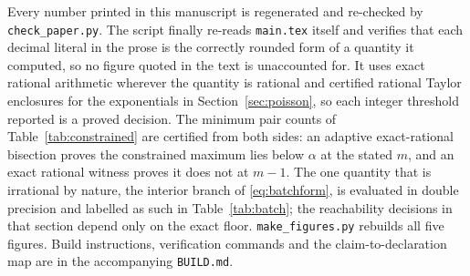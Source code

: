 \documentclass[11pt]{article}
\theoremstyle{remark}\newtheorem{remark}[theorem]{Remark}
\begin{document}
Every number printed in this manuscript is regenerated and re-checked by
\texttt{check\_paper.py}. The script finally re-reads \texttt{main.tex} itself
and verifies that each decimal literal in the prose is the correctly rounded form
of a quantity it computed, so no figure quoted in the text is unaccounted for. It
uses exact rational arithmetic wherever the
quantity is rational and certified rational Taylor enclosures for the
exponentials in Section~\ref{sec:poisson}, so each integer threshold reported is
a proved decision. The minimum pair counts of Table~\ref{tab:constrained} are
certified from both sides: an adaptive exact-rational bisection proves the
constrained maximum lies below $\alpha$ at the stated $m$, and an exact rational
witness proves it does not at $m-1$. The one quantity that is irrational by
nature, the interior branch of \eqref{eq:batchform}, is evaluated in double
precision and labelled as such in Table~\ref{tab:batch}; the reachability
decisions in that section depend only on the exact floor.
\texttt{make\_figures.py} rebuilds all five figures. Build instructions,
verification commands and the claim-to-declaration map are in the accompanying
\texttt{BUILD.md}.



\end{document}
